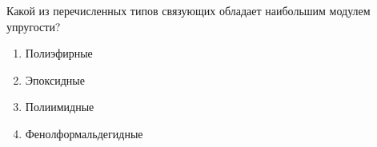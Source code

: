 
Какой из перечисленных типов связующих обладает наибольшим модулем упругости?

\begin{enumerate}
    \item Полиэфирные
    \item Эпоксидные
    \item Полиимидные
    \item Фенолформальдегидные
\end{enumerate}